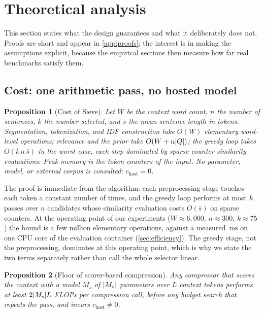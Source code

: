 \documentclass[preprint,12pt]{elsarticle}
\DeclarePairedDelimiter\abs{\lvert}{\rvert}
\newtheorem{proposition}{Proposition}
\theoremstyle{remark}
\newcommand{\method}{Sieve}
\newcommand{\ms}{\ensuremath{\mathrm{ms}}}
\begin{document}
\section{Theoretical analysis}
\label{sec:theory}
This section states what the design guarantees and what it
deliberately does not. Proofs are short and appear in
\autoref{app:proofs}; the interest is in making the assumptions
explicit, because the empirical sections then measure how far real
benchmarks satisfy them.

\subsection{Cost: one arithmetic pass, no hosted model}
\begin{proposition}[Cost of \method{}]
\label{prop:cost}
Let $W$ be the context word count, $n$ the number of sentences, $k$
the number selected, and $\bar{s}$ the mean sentence length in tokens.
Segmentation, tokenization, and IDF construction take $O(W)$
elementary word-level operations; relevance and the prior take
$O(W + n\abs{Q})$; the greedy loop takes $O(k\,n\,\bar{s})$ in the
worst case, each step dominated by sparse-counter similarity
evaluations. Peak memory is the token counters of the input. No
parameter, model, or external corpus is consulted:
$c_{\mathrm{host}} = 0$.
\end{proposition}

The proof is immediate from the algorithm: each preprocessing stage
touches each token a constant number of times, and the greedy loop
performs at most $k$ passes over $n$ candidates whose similarity
evaluation costs $O(\bar{s})$ on sparse counters. At the operating
point of our experiments ($W \approx 6{,}000$, $n \approx 300$,
$k \approx 75$) the bound is a few million elementary operations,
against a measured \TimeSieSixk\,\ms{} on one CPU core of the
evaluation container (\autoref{sec:efficiency}). The greedy stage, not
the preprocessing, dominates at this operating point, which is why we
state the two terms separately rather than call the whole selector
linear.

\begin{proposition}[Floor of scorer-based compression]
\label{prop:floor}
Any compressor that scores the context with a model $M_s$ of
$\abs{M_s}$ parameters over $L$ context tokens performs at least
$2\abs{M_s} L$ FLOPs per compression call, before any budget search
that repeats the pass, and incurs $c_{\mathrm{host}} \ne 0$.
\end{proposition}
\end{document}
